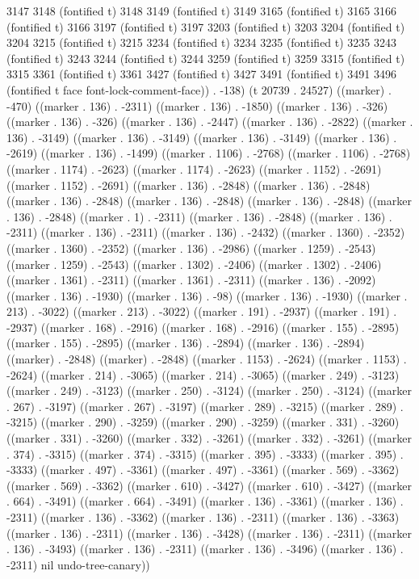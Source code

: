 3147 3148 (fontified t) 3148 3149 (fontified t) 3149 3165 (fontified t) 3165 3166 (fontified t) 3166 3197 (fontified t) 3197 3203 (fontified t) 3203 3204 (fontified t) 3204 3215 (fontified t) 3215 3234 (fontified t) 3234 3235 (fontified t) 3235 3243 (fontified t) 3243 3244 (fontified t) 3244 3259 (fontified t) 3259 3315 (fontified t) 3315 3361 (fontified t) 3361 3427 (fontified t) 3427 3491 (fontified t) 3491 3496 (fontified t face font-lock-comment-face)) . -138) (t 20739 . 24527) ((marker) . -470) ((marker . 136) . -2311) ((marker . 136) . -1850) ((marker . 136) . -326) ((marker . 136) . -326) ((marker . 136) . -2447) ((marker . 136) . -2822) ((marker . 136) . -3149) ((marker . 136) . -3149) ((marker . 136) . -3149) ((marker . 136) . -2619) ((marker . 136) . -1499) ((marker . 1106) . -2768) ((marker . 1106) . -2768) ((marker . 1174) . -2623) ((marker . 1174) . -2623) ((marker . 1152) . -2691) ((marker . 1152) . -2691) ((marker . 136) . -2848) ((marker . 136) . -2848) ((marker . 136) . -2848) ((marker . 136) . -2848) ((marker . 136) . -2848) ((marker . 136) . -2848) ((marker . 1) . -2311) ((marker . 136) . -2848) ((marker . 136) . -2311) ((marker . 136) . -2311) ((marker . 136) . -2432) ((marker . 1360) . -2352) ((marker . 1360) . -2352) ((marker . 136) . -2986) ((marker . 1259) . -2543) ((marker . 1259) . -2543) ((marker . 1302) . -2406) ((marker . 1302) . -2406) ((marker . 1361) . -2311) ((marker . 1361) . -2311) ((marker . 136) . -2092) ((marker . 136) . -1930) ((marker . 136) . -98) ((marker . 136) . -1930) ((marker . 213) . -3022) ((marker . 213) . -3022) ((marker . 191) . -2937) ((marker . 191) . -2937) ((marker . 168) . -2916) ((marker . 168) . -2916) ((marker . 155) . -2895) ((marker . 155) . -2895) ((marker . 136) . -2894) ((marker . 136) . -2894) ((marker) . -2848) ((marker) . -2848) ((marker . 1153) . -2624) ((marker . 1153) . -2624) ((marker . 214) . -3065) ((marker . 214) . -3065) ((marker . 249) . -3123) ((marker . 249) . -3123) ((marker . 250) . -3124) ((marker . 250) . -3124) ((marker . 267) . -3197) ((marker . 267) . -3197) ((marker . 289) . -3215) ((marker . 289) . -3215) ((marker . 290) . -3259) ((marker . 290) . -3259) ((marker . 331) . -3260) ((marker . 331) . -3260) ((marker . 332) . -3261) ((marker . 332) . -3261) ((marker . 374) . -3315) ((marker . 374) . -3315) ((marker . 395) . -3333) ((marker . 395) . -3333) ((marker . 497) . -3361) ((marker . 497) . -3361) ((marker . 569) . -3362) ((marker . 569) . -3362) ((marker . 610) . -3427) ((marker . 610) . -3427) ((marker . 664) . -3491) ((marker . 664) . -3491) ((marker . 136) . -3361) ((marker . 136) . -2311) ((marker . 136) . -3362) ((marker . 136) . -2311) ((marker . 136) . -3363) ((marker . 136) . -2311) ((marker . 136) . -3428) ((marker . 136) . -2311) ((marker . 136) . -3493) ((marker . 136) . -2311) ((marker . 136) . -3496) ((marker . 136) . -2311) nil undo-tree-canary))
